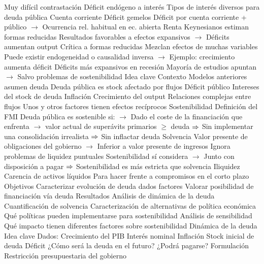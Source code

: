 \documentclass{nuevotema}
\begin{document}
\begin{esquemal}
				\4 Muy difícil contrastación
				\4[] Déficit endógeno a interés
				\4[] Tipos de interés diversos para deuda pública
			\3 Cuenta corriente
				\4 Déficit gemelos
				\4[] Déficit por cuenta corriente + público
				\4[] $\to$ Ocurrencia rel. habitual en ec. abierta
			\3 Renta
				\4 Keynesianos estiman formas reducidas
				\4[] Resultados favorables a efectos expansivos
				\4[] $\to$ Déficits aumentan output
				\4 Crítica a formas reducidas
				\4[] Mezclan efectos de muchas variables
				\4[] Puede existir endogeneidad o causalidad inversa
				\4[] $\to$ Ejemplo: crecimiento aumenta déficit
				\4 Déficits más expansivos en recesión
				\4[] Mayoría de estudios apuntan
				\4[] $\to$ Salvo problemas de sostenibilidad
	\1 
		\2 Idea clave
			\3 Contexto
				\4 Modelos anteriores asumen deuda
				\4 Deuda pública es stock afectado por flujos
				\4[] Déficit público
				\4[] Intereses del stock de deuda
				\4[] Inflación
				\4[] Crecimiento del output
				\4 Relaciones complejas entre flujos
				\4[] Unos y otros factores tienen efectos recíprocos
				\4 Sostenibilidad
				\4[] Definición del FMI
				\4[] Deuda pública es sostenible si:
				\4[] $\to$ Dado el coste de la financiación que enfrenta
				\4[] $\to$ valor actual de superávits primarios $\geq$ deuda
				\4[] $\Rightarrow$ Sin implementar una consolidación irrealista
				\4[] $\Rightarrow$ Sin inflactar deuda
				\4 Solvencia
				\4[] Valor presente de obligaciones del gobierno
				\4[] $\to$  Inferior a valor presente de ingresos
				\4[] Ignora problemas de liquidez puntuales
				\4[] Sostenibilidad sí considera
				\4[] $\to$ Junto con disposición a pagar
				\4[] $\Rightarrow$ Sostenibilidad es más estricta que solvencia
				\4 Iliquidez
				\4[] Carencia de activos líquidos
				\4[] Para hacer frente a compromisos en el corto plazo
			\3 Objetivos
				\4 Caracterizar evolución de deuda dados factores
				\4 Valorar posibilidad de financiación vía deuda
			\3 Resultados
				\4 Análisis de dinámica de la deuda
				\4[] Cuantificación de solvencia
				\4 Caracterización de alternativas de política económica
				\4[] Qué políticas pueden implementarse para sostenibilidad
				\4 Análisis de sensibilidad
				\4[] Qué impacto tienen diferentes factores sobre sostenibilidad
		\2 Dinámica de la deuda
			\3 Idea clave
				\4 Dados:
				\4[] Crecimiento del PIB
				\4[] Interés nominal
				\4[] Inflación
				\4[] Stock inicial de deuda
				\4[] Déficit
				\4[$\to$] ¿Cómo será la deuda en el futuro?
				\4[$\to$] ¿Podrá pagarse?
			\3 Formulación
				\4 Restricción presupuestaria del gobierno

\end{esquemal}
\end{document}
